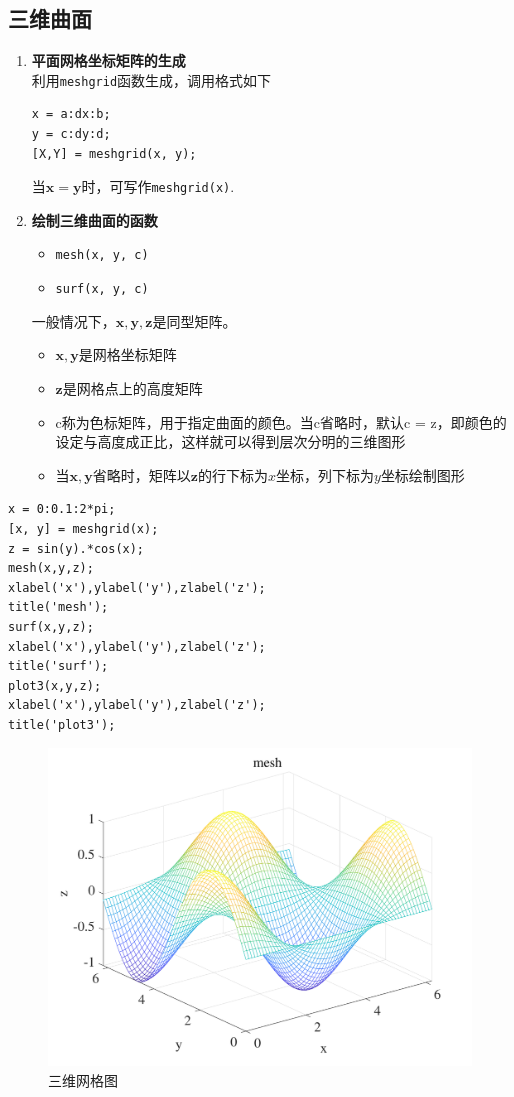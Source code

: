 \subsection{三维曲面}
\begin{enumerate}[1.]
	\item \textbf{平面网格坐标矩阵的生成}\\
	利用\lstinline|meshgrid|函数生成，调用格式如下
	\begin{lstlisting}
x = a:dx:b;
y = c:dy:d;
[X,Y] = meshgrid(x, y);
	\end{lstlisting}
当$\bm{x} = \bm{y}$时，可写作\lstinline|meshgrid(x)|.
	\item \textbf{绘制三维曲面的函数}
	\begin{itemize}
		\item \lstinline|mesh(x, y, c)|
		\item \lstinline|surf(x, y, c)|
	\end{itemize}
	一般情况下，$\bm{x},\bm{y},\bm{z}$是同型矩阵。
	\begin{itemize}
		\item $\bm{x}, \bm{y}$是网格坐标矩阵
		\item $\bm{z}$是网格点上的高度矩阵
		\item c称为色标矩阵，用于指定曲面的颜色。当c省略时，默认c = z，即颜色的设定与高度成正比，这样就可以得到层次分明的三维图形
		\item 当$\bm{x},\bm{y}$省略时，矩阵以$\bm{z}$的行下标为$x$坐标，列下标为$y$坐标绘制图形
	\end{itemize}
\end{enumerate}
\begin{lstlisting}
x = 0:0.1:2*pi;
[x, y] = meshgrid(x);
z = sin(y).*cos(x);
mesh(x,y,z);
xlabel('x'),ylabel('y'),zlabel('z');
title('mesh');
surf(x,y,z);
xlabel('x'),ylabel('y'),zlabel('z');
title('surf');
plot3(x,y,z);
xlabel('x'),ylabel('y'),zlabel('z');
title('plot3');
\end{lstlisting}
\begin{figure}[!htb]
	\centering
	\includegraphics[width=0.7\linewidth]{pic/mesh.pdf}
	\vspace*{-2em}
	\caption{三维网格图}
\end{figure}
